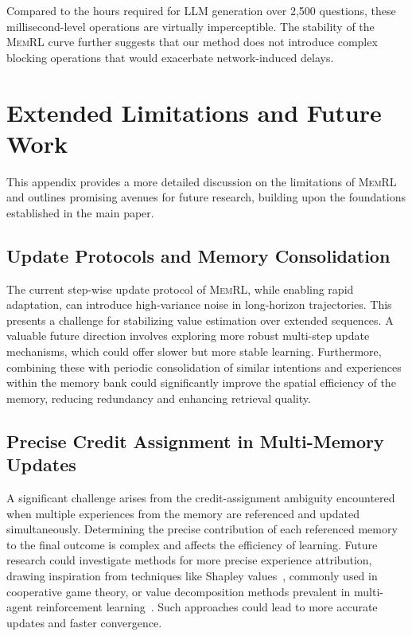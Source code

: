 \documentclass{article}
\theoremstyle{plain}
\theoremstyle{definition}
\theoremstyle{remark}
\begin{document}
Compared to the hours required for LLM generation over 2,500 questions, these millisecond-level operations are virtually imperceptible. The stability of the \textsc{MemRL} curve further suggests that our method does not introduce complex blocking operations that would exacerbate network-induced delays.


\section{Extended Limitations and Future Work}\label{app:future_work}

This appendix provides a more detailed discussion on the limitations of \textsc{MemRL} and outlines promising avenues for future research, building upon the foundations established in the main paper.

\subsection{Update Protocols and Memory Consolidation}
The current step-wise update protocol of \textsc{MemRL}, while enabling rapid adaptation, can introduce high-variance noise in long-horizon trajectories. This presents a challenge for stabilizing value estimation over extended sequences. A valuable future direction involves exploring more robust multi-step update mechanisms, which could offer slower but more stable learning. Furthermore, combining these with periodic consolidation of similar intentions and experiences within the memory bank could significantly improve the spatial efficiency of the memory, reducing redundancy and enhancing retrieval quality.

\subsection{Precise Credit Assignment in Multi-Memory Updates}
A significant challenge arises from the credit-assignment ambiguity encountered when multiple experiences from the memory are referenced and updated simultaneously. Determining the precise contribution of each referenced memory to the final outcome is complex and affects the efficiency of learning. Future research could investigate methods for more precise experience attribution, drawing inspiration from techniques like Shapley values~\citep{shapley1953value}, commonly used in cooperative game theory, or value decomposition methods prevalent in multi-agent reinforcement learning~\citep{rashid2020monotonic,sunehag2017value}. Such approaches could lead to more accurate updates and faster convergence.
\end{document}
